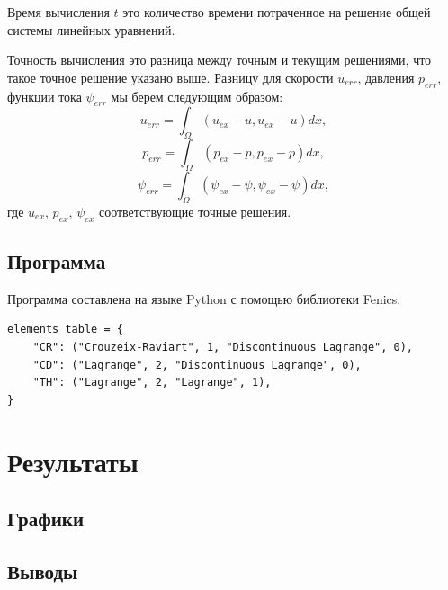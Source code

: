 \documentclass[12pt]{article}
\begin{document}
Время вычисления $t$ это количество времени потраченное на решение общей системы линейных уравнений.

Точность вычисления это разница между точным и текущим решениями, что такое точное решение указано выше. Разницу для скорости $u_{err}$, давления $p_{err}$, функции тока $\psi_{err}$ мы берем следующим образом:
\begin{equation}
u_{err} = \int_{\Omega} (u_{ex} - u, u_{ex} - u) dx,
\end{equation}
\begin{equation}
p_{err} = \int_{\Omega} (p_{ex} - p, p_{ex} - p) dx,
\end{equation}
\begin{equation}
\psi_{err} = \int_{\Omega} (\psi_{ex} - \psi, \psi_{ex} - \psi) dx,
\end{equation}
где $u_{ex}$, $p_{ex}$, $\psi_{ex}$ соответствующие точные решения.

\subsection{Программа}
Программа составлена на языке Python с помощью библиотеки Fenics.
\begin{lstlisting}
elements_table = {
    "CR": ("Crouzeix-Raviart", 1, "Discontinuous Lagrange", 0),    
    "CD": ("Lagrange", 2, "Discontinuous Lagrange", 0),    
    "TH": ("Lagrange", 2, "Lagrange", 1),
}
\end{lstlisting}

\section{Результаты}
\subsection{Графики}
\subsection{Выводы}
\end{document}
